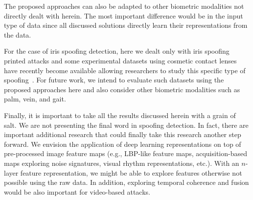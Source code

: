 The proposed approaches can also be adapted to other biometric modalities not directly dealt with herein. The most important difference would be in the input type of data since all discussed solutions directly learn their representations from the data.

For the case of iris spoofing detection, here we dealt only with iris spoofing printed attacks and some experimental datasets using cosmetic contact lenses have recently become available allowing researchers to study this specific type of spoofing~\cite{Bowyer:Computer:2014,Yadav:TIFS:2014}. 
For future work, we intend to evaluate such datasets using the proposed approaches here and also consider other biometric modalities such as palm, vein, and gait.

Finally, it is important to take all the results discussed herein with a grain of salt. We are not presenting the final word in spoofing detection. In fact, there are important additional research that could finally take this research another step forward. We envision the application of deep learning representations on top of pre-processed image feature maps (e.g., LBP-like feature maps, acquisition-based maps exploring noise signatures, visual rhythm representations, etc.). With an $n$-layer feature representation, we might be able to explore features otherwise not possible using the raw data. In addition, exploring temporal coherence and fusion would be also important for video-based attacks.
